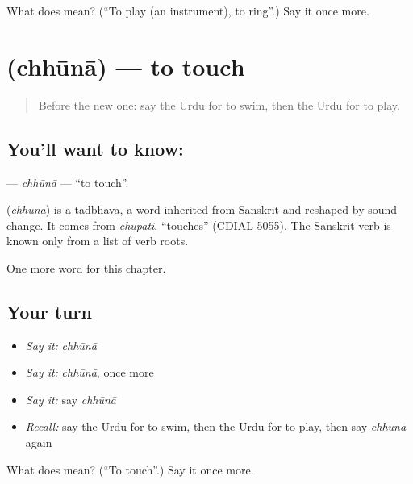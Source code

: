 \begin{tcolorbox}[breakable,colback=teal!4,colframe=teal!35!black,title={Before you move on}]
What does  mean? (\textquotedblleft{}To play (an instrument), to ring\textquotedblright{}.) Say it once more.
\end{tcolorbox}
\section[\texorpdfstring{\ur{چھونا} (chhūnā)}{چھونا (chhūnā)}]{ (chhūnā) — to touch}

\label{lesson:UR-C138-chhuna}



\begin{quote}
Before the new one: say the Urdu for to swim, then the Urdu for to play.
\end{quote}

\subsection*{You'll want to know: }
\textbf{} — \emph{chhūnā} — \textquotedblleft{}to touch\textquotedblright{}.

\begin{cousinweb}
\textbf{} (\emph{chhūnā}) is a tadbhava, a word inherited from Sanskrit and reshaped by sound change. It comes from \emph{chupati}, \textquotedblleft{}touches\textquotedblright{} (CDIAL 5055). The Sanskrit verb is known only from a list of verb roots.
\end{cousinweb}

\begin{grammarlens}[title={What you've built}]
One more word for this chapter.
\end{grammarlens}

\subsection*{Your turn}
\begin{itemize}
\raggedright
  \item \emph{Say it:} \emph{chhūnā}
  \item \emph{Say it:} \emph{chhūnā}, once more
  \item \emph{Say it:} say \emph{chhūnā}
  \item \emph{Recall:} say the Urdu for to swim, then the Urdu for to play, then say \emph{chhūnā} again
\end{itemize}

\begin{tcolorbox}[breakable,colback=teal!4,colframe=teal!35!black,title={Before you move on}]
What does  mean? (\textquotedblleft{}To touch\textquotedblright{}.) Say it once more.
\end{tcolorbox}
